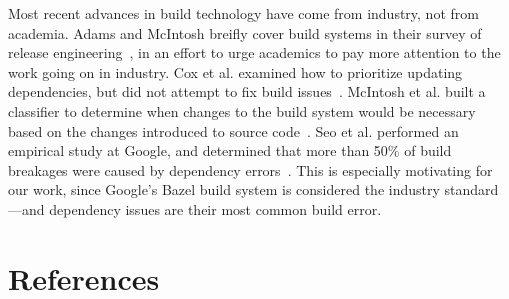 \documentclass[10pt,conference]{IEEEtran}
\begin{document}
Most recent advances in build technology have come from industry, not from
academia. Adams and McIntosh breifly cover build systems in their survey of
release engineering~\cite{adams2016modern}, in an effort to urge academics to
pay more attention to the work going on in industry. Cox et al. examined how
to prioritize updating dependencies, but did not attempt to fix build issues~\cite{cox2015measuring}.
McIntosh et al. built a classifier to determine when changes to the build
system would be necessary based on the changes introduced to source code~\cite{mcintosh2014mining}.
Seo et al. performed an empirical study at Google, and determined that more
than 50\% of build breakages were caused by dependency errors~\cite{googlebuilderrors}.
This is especially motivating for our work, since Google's Bazel build system
is considered the industry standard---and dependency issues are their most
common build error.

\section{References}

\begingroup
\renewcommand{\section}[2]{}%



%
%
\endgroup
\end{document}
